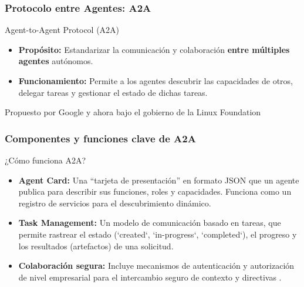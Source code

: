 \documentclass[handout]{beamer}
\begin{document}
\begin{frame}
    \frametitle{Protocolo entre Agentes: A2A}
  \begin{exampleblock}{Agent-to-Agent Protocol (A2A)}
    \begin{itemize}
        \item \textbf{Propósito:} Estandarizar la comunicación y colaboración \textbf{entre múltiples agentes} autónomos.
        \item \textbf{Funcionamiento:} Permite a los agentes descubrir las capacidades de otros, delegar tareas y gestionar el estado de dichas tareas.
    \end{itemize}
\raggedleft\footnotesize{Propuesto por Google y ahora bajo el gobierno de la Linux Foundation \parencite{google2025a2a, linuxfoundation2025a2a}}
  \end{exampleblock}
\end{frame}

\begin{frame}
    \frametitle{Componentes y funciones clave de A2A}
    \begin{block}{¿Cómo funciona A2A?}
        \begin{itemize}
            \item \textbf{Agent Card:} Una ``tarjeta de presentación'' en formato JSON que un agente publica para describir sus funciones, roles y capacidades. Funciona como un registro de servicios para el descubrimiento dinámico.
            \item \textbf{Task Management:} Un modelo de comunicación basado en tareas, que permite rastrear el estado (`created`, `in-progress`, `completed`), el progreso y los resultados (artefactos) de una solicitud.
            \item \textbf{Colaboración segura:} Incluye mecanismos de autenticación y autorización de nivel empresarial para el intercambio seguro de contexto y directivas \parencite{jeong2025studymcpxa2a}.
        \end{itemize}
    \end{block}
\end{frame}
\end{document}

